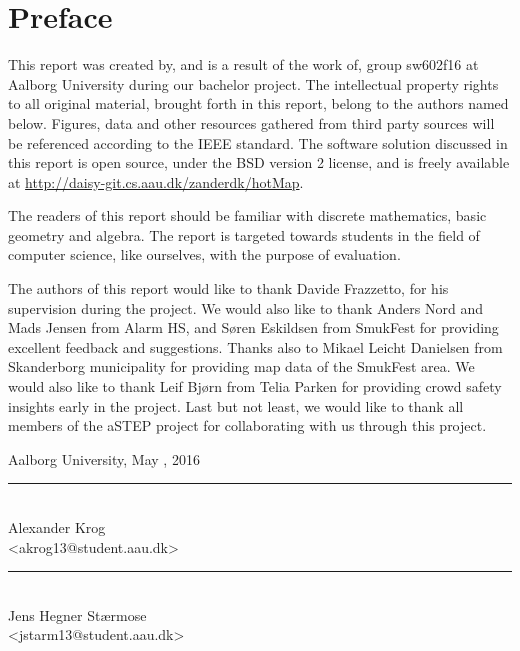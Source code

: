 \chapter*{Preface}\label{ch:preface}
This report was created by, and is a result of the work of, group sw602f16 at Aalborg University during our bachelor project. The intellectual property rights to all original material, brought forth in this report, belong to the authors named below. Figures, data and other resources gathered from third party sources will be referenced according to the IEEE standard. The software solution discussed in this report is open source, under the BSD version 2 license, and is freely available at \url{http://daisy-git.cs.aau.dk/zanderdk/hotMap}.

The readers of this report should be familiar with discrete mathematics, basic geometry and algebra. The report is targeted towards students in the field of computer science, like ourselves, with the purpose of evaluation.

The authors of this report would like to thank Davide Frazzetto, for his supervision during the project. We would also like to thank Anders Nord and Mads Jensen from Alarm HS, and Søren Eskildsen from SmukFest for providing excellent feedback and suggestions. Thanks also to Mikael Leicht Danielsen from Skanderborg municipality for providing map data of the SmukFest area. We would also like to thank Leif Bjørn from Telia Parken for providing crowd safety insights early in the project. Last but not least, we would like to thank all members of the aSTEP project for collaborating with us through this project.

\vspace{\baselineskip}\hfill Aalborg University, May , 2016
\vfill

\noindent
\begin{minipage}[b]{0.45\textwidth}
 \centering
 \rule{\textwidth}{0.5pt}\\
  Alexander Krog\\
 {\footnotesize <akrog13@student.aau.dk>}
\end{minipage}
%
\hfill
%
\begin{minipage}[b]{0.45\textwidth}
 \centering
 \rule{\textwidth}{0.5pt}\\
  Jens Hegner Stærmose\\
 {\footnotesize <jstarm13@student.aau.dk>}
\end{minipage}
%
\vspace{3\baselineskip}

